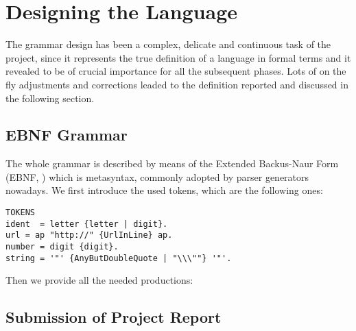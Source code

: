 \chapter{\label{chapter2} Designing the Language}

The grammar design has been a complex, delicate and continuous task of the project, since it represents the true definition of a language in formal terms and it revealed to be of crucial importance for all the subsequent phases. Lots of on the fly adjustments and corrections leaded to the definition reported and discussed in the following section.

\section{EBNF Grammar}

The whole grammar is described by means of the Extended Backus-Naur Form (EBNF, \cite{ebnf}) which is metasyntax, commonly adopted by parser generators nowadays. We first introduce the used tokens, which are the following ones:

\begin{lstlisting}
TOKENS
ident  = letter {letter | digit}.
url = ap "http://" {UrlInLine} ap.
number = digit {digit}.
string = '"' {AnyButDoubleQuote | "\\\""} '"'.
\end{lstlisting}

Then we provide all the needed productions:

\section{Submission of Project Report}